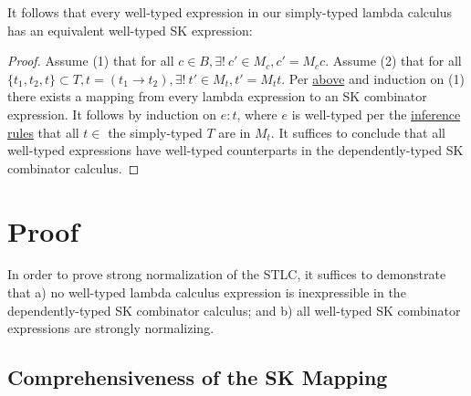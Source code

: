 \documentclass[11pt]{article}
\begin{document}
It follows that every well-typed expression in our simply-typed lambda calculus has an equivalent well-typed SK expression:

\begin{proof}
Assume (1) that for all $c \in B, \exists!\ c' \in M_{c}, c' = M_{c} c$.
Assume (2) that for all $\{t_{1}, t_{2}, t\} \subset T, t = (t_{1} \rightarrow t_{2}), \exists!\ t' \in M_{t}, t' = M_{t} t$.
Per \href{decomplemma:1}{above} and induction on (1) there exists a mapping from every lambda expression to an SK combinator expression.
It follows by induction on $e : t$, where $e$ is well-typed per the \href{decomplemma:1}{inference rules} that all $t \in$ the simply-typed $T$ are in $M_{t}$.
It suffices to conclude that all well-typed expressions have well-typed counterparts in the dependently-typed SK combinator calculus.
\end{proof}
\section{Proof}
\label{sec:org8ba8336}

In order to prove strong normalization of the STLC, it suffices to demonstrate that a) no well-typed lambda calculus expression is inexpressible in the dependently-typed SK combinator calculus; and b) all well-typed SK combinator expressions are strongly normalizing.
\subsection{Comprehensiveness of the SK Mapping}
\label{sec:org4c91cba}
\end{document}
